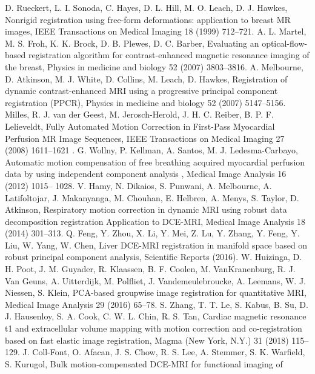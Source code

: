 \documentclass[num-refs]{wiley-article}
\begin{document}
\begin{thebibliography}{55}
	D. Rueckert, L. I. Sonoda, C. Hayes, D. L. Hill, M. O. Leach, D. J. Hawkes, Nonrigid registration using free-form deformations: application to breast MR images, IEEE Transactions on Medical Imaging 18 (1999) 712--721.
	A. L. Martel, M. S. Froh, K. K. Brock, D. B. Plewes, D. C. Barber, Evaluating an optical-flow-based registration algorithm for contrast-enhanced
	magnetic resonance imaging of the breast, Physics in medicine and biology 52 (2007) 3803--3816.
	A. Melbourne, D. Atkinson, M. J. White, D. Collins, M. Leach, D. Hawkes,
	Registration of dynamic contrast-enhanced MRI using a progressive principal component registration (PPCR), Physics in medicine and biology 52 (2007) 5147--5156.
	Milles, R. J. van der Geest, M. Jerosch-Herold, J. H. C. Reiber, B. P. F. Lelieveldt, Fully Automated Motion Correction in First-Pass Myocardial
	Perfusion MR Image Sequences, IEEE Transactions on Medical Imaging 27 (2008) 1611--1621 .
	G. Wollny, P. Kellman, A. Santos, M. J. Ledesma-Carbayo, Automatic
	motion compensation of free breathing acquired myocardial perfusion data by using independent component analysis , Medical Image Analysis 16 (2012) 1015-- 1028.
	V. Hamy, N. Dikaios, S. Punwani, A. Melbourne, A. Latifoltojar,
	J. Makanyanga, M. Chouhan, E. Helbren, A. Menys, S. Taylor, D. Atkinson, Respiratory motion correction in dynamic MRI using robust data decomposition registration Application to DCE-MRI, Medical Image Analysis 18 (2014) 301--313.
	Q. Feng, Y. Zhou, X. Li, Y. Mei, Z. Lu, Y. Zhang, Y. Feng, Y. Liu, W. Yang, W. Chen, Liver DCE-MRI registration in manifold space based on robust
	principal component analysis, Scientific Reports (2016).
	W. Huizinga, D. H. Poot, J. M. Guyader, R. Klaassen, B. F. Coolen, M. VanKranenburg, R. J. Van Geuns, A. Uitterdijk, M. Polfliet, J. Vandemeulebroucke, A. Leemans, W. J. Niessen, S. Klein, PCA-based groupwise image registration for quantitative MRI, Medical Image Analysis 29 (2016) 65--78.
	S. Zhang, T. T. Le, S. Kabus, B. Su, D. J. Hausenloy, S. A. Cook, C. W. L.
	Chin, R. S. Tan, Cardiac magnetic resonance t1 and extracellular volume
	mapping with motion correction and co-registration based on fast elastic image registration, Magma (New York, N.Y.) 31 (2018) 115--129.
	J. Coll-Font, O. Afacan, J. S. Chow, R. S. Lee, A. Stemmer, S. K. Warfield,	S. Kurugol, Bulk motion-compensated DCE-MRI for functional imaging of

\end{thebibliography}
\end{document}
